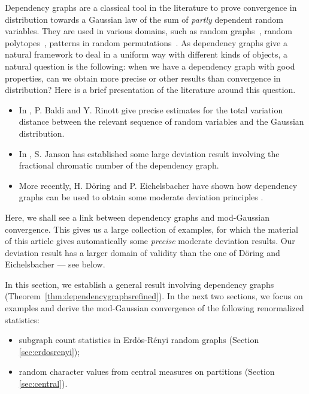 \documentclass[12pt,a4paper,reqno]{amsart}
\theoremstyle{remark}
\begin{document}
Dependency graphs are a classical tool in the literature to prove convergence in distribution towards a Gaussian law of the sum of {\em partly} dependent random variables. They are used in various domains, such as random graphs~\cite[pages 147-152]{JLR00}, random polytopes~\cite{BV07}, patterns in random permutations~\cite{Bona10}. As dependency graphs give a natural framework to deal in a uniform way with different kinds of objects, a natural question is the following:  when we have a dependency graph with good properties, can we obtain more precise or other results than convergence in distribution? Here is a brief presentation of the literature around this question.\vspace{2mm}
\begin{itemize}
    \item In \cite{BR89}, P. Baldi and Y. Rinott give precise estimates for the total variation distance between the relevant sequence of random variables and the Gaussian distribution.\vspace{2mm}
  \item In \cite{Jan04}, S. Janson has established some large deviation result involving the fractional chromatic number of the dependency graph.\vspace{2mm}
  \item More recently, H. D\"oring and P. Eichelsbacher have shown how dependency graphs can be used to obtain some moderate deviation principles
      \cite[Section 2]{DE12}.\vspace{2mm}
\end{itemize}
Here, we shall see a link between dependency graphs and mod-Gaussian convergence. This gives us a large collection of examples, for which the material of this article gives automatically some {\em precise} moderate deviation results. Our deviation result has a larger domain of validity than the one of D{\"o}ring and Eichelsbacher --- see below.\bigskip

In this section, we establish a general result involving dependency graphs (Theorem~\ref{thm:dependencygraphsrefined}). In the next two sections, we focus on examples and derive the mod-Gaussian convergence of the following renormalized statistics:\vspace{2mm}
\begin{itemize}
  \item subgraph count statistics in Erd\"os-R\'enyi random graphs (Section \ref{sec:erdosrenyi});\vspace{2mm}
  \item random character values from central measures on partitions (Section \ref{sec:central}).
\end{itemize}
\medskip
\end{document}
